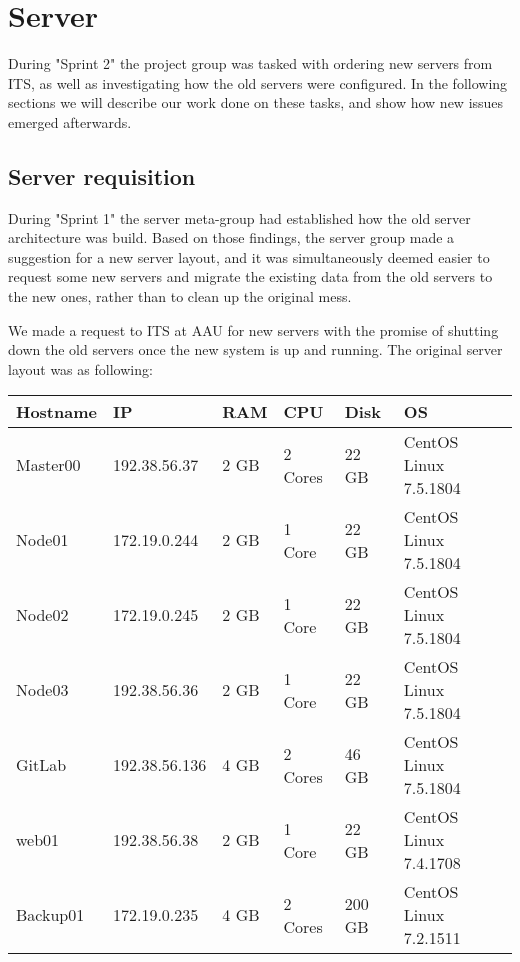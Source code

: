 \section{Server}\label{SEC:S2ServerWork}
During "Sprint 2" the project group was tasked with ordering new servers from ITS, as well as investigating how the old servers were configured. 
In the following sections we will describe our work done on these tasks, and show how new issues emerged afterwards. 

\subsection{Server requisition}
During "Sprint 1" the server meta-group had established how the old server architecture was build. 
Based on those findings, the server group made a suggestion for a new server layout, and it was simultaneously deemed easier to request some new servers and migrate the existing data from the old servers to the new ones, rather than to clean up the original mess. 

We made a request to ITS at AAU for new servers with the promise of shutting down the old servers once the new system is up and running. The original server layout was as following:

\begin{table}[H]

\begin{tabular}{|l|l|l|l|l|l|}
\hline
Hostname & IP 			& RAM 	& CPU 		& Disk 	& OS 					\\ \hline
Master00 & 192.38.56.37 	& 2 GB 	& 2 Cores 	& 22 GB 	& CentOS Linux 7.5.1804 	\\ \hline
Node01 	& 172.19.0.244 	& 2 GB 	& 1 Core 	& 22 GB 	& CentOS Linux 7.5.1804 	\\ \hline
Node02	& 172.19.0.245	& 2 GB	& 1 Core		& 22 GB	& CentOS Linux 7.5.1804	\\ \hline
Node03	& 192.38.56.36	& 2 GB	& 1 Core 	& 22 GB	& CentOS Linux 7.5.1804 	\\ \hline
GitLab 	& 192.38.56.136	& 4 GB	& 2 Cores 	& 46 GB 	& CentOS Linux 7.5.1804 	\\ \hline
web01	& 192.38.56.38	& 2 GB	& 1 Core		& 22 GB 	& CentOS Linux 7.4.1708 	\\ \hline
Backup01	& 172.19.0.235	& 4 GB	& 2 Cores	& 200 GB & CentOS Linux 7.2.1511 	\\ \hline
\end{tabular}
\end{table}

